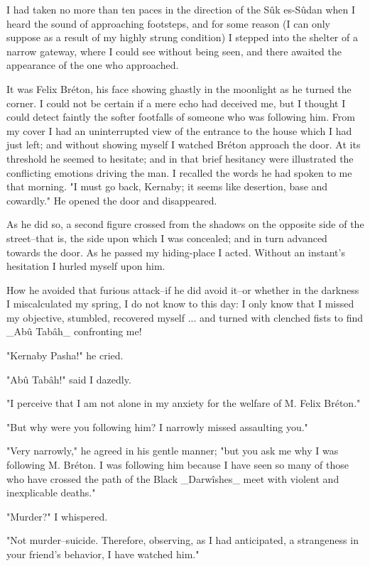 I had taken no more than ten paces in the direction of the Sûk
es-Sûdan when I heard the sound of approaching footsteps, and for some
reason (I can only suppose as a result of my highly strung condition)
I stepped into the shelter of a narrow gateway, where I could see
without being seen, and there awaited the appearance of the one who
approached.

It was Felix Bréton, his face showing ghastly in the moonlight as he
turned the corner. I could not be certain if a mere echo had deceived
me, but I thought I could detect faintly the softer footfalls of
someone who was following him. From my cover I had an uninterrupted
view of the entrance to the house which I had just left; and without
showing myself I watched Bréton approach the door. At its threshold
he seemed to hesitate; and in that brief hesitancy were illustrated
the conflicting emotions driving the man. I recalled the words he had
spoken to me that morning. "I must go back, Kernaby; it seems like
desertion, base and cowardly." He opened the door and disappeared.

As he did so, a second figure crossed from the shadows on the opposite
side of the street--that is, the side upon which I was concealed; and
in turn advanced towards the door. As he passed my hiding-place I
acted. Without an instant's hesitation I hurled myself upon him.

How he avoided that furious attack--if he did avoid it--or whether in
the darkness I miscalculated my spring, I do not know to this day: I
only know that I missed my objective, stumbled, recovered myself ...
and turned with clenched fists to find _Abû Tabâh_ confronting me!

"Kernaby Pasha!" he cried.

"Abû Tabâh!" said I dazedly.

"I perceive that I am not alone in my anxiety for the welfare of M.
Felix Bréton."

"But why were you following him? I narrowly missed assaulting you."

"Very narrowly," he agreed in his gentle manner; "but you ask me why
I was following M. Bréton. I was following him because I have seen so
many of those who have crossed the path of the Black _Darwîshes_ meet
with violent and inexplicable deaths."

"Murder?" I whispered.

"Not murder--suicide. Therefore, observing, as I had anticipated,
a strangeness in your friend's behavior, I have watched him."

